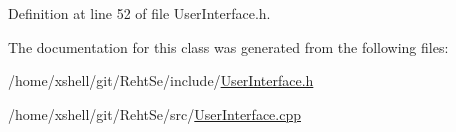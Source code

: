 Definition at line 52 of file User\+Interface.\+h.



The documentation for this class was generated from the following files\+:\begin{DoxyCompactItemize}
\item 
/home/xshell/git/\+Reht\+Se/include/\hyperlink{_user_interface_8h}{User\+Interface.\+h}\item 
/home/xshell/git/\+Reht\+Se/src/\hyperlink{_user_interface_8cpp}{User\+Interface.\+cpp}\end{DoxyCompactItemize}
